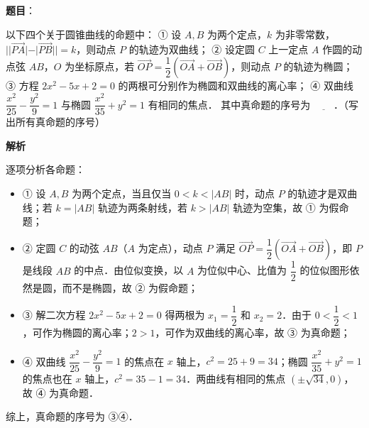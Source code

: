 \begin{answer}

\textbf{题目}：

以下四个关于圆锥曲线的命题中：
① 设 $A, B$ 为两个定点，$k$ 为非零常数，$||\vec{PA}| - |\vec{PB}|| = k$，则动点 $P$ 的轨迹为双曲线；
② 设定圆 $C$ 上一定点 $A$ 作圆的动点弦 $AB$，$O$ 为坐标原点，若 $\vec{OP} = \dfrac{1}{2}(\vec{OA} + \vec{OB})$，则动点 $P$ 的轨迹为椭圆；
③ 方程 $2x^2 - 5x + 2 = 0$ 的两根可分别作为椭圆和双曲线的离心率；
④ 双曲线 $\dfrac{x^2}{25} - \dfrac{y^2}{9} = 1$ 与椭圆 $\dfrac{x^2}{35} + y^2 = 1$ 有相同的焦点．
其中真命题的序号为 $\underline{\hspace{2em}}$．（写出所有真命题的序号）

\textbf{解析}

逐项分析各命题：
\begin{itemize}
\item ① 设 $A, B$ 为两个定点，当且仅当 $0 < k < |AB|$ 时，动点 $P$ 的轨迹才是双曲线；若 $k = |AB|$ 轨迹为两条射线，若 $k > |AB|$ 轨迹为空集，故 ① 为假命题；
\item ② 定圆 $C$ 的动弦 $AB$（$A$ 为定点），动点 $P$ 满足 $\vec{OP} = \dfrac{1}{2}(\vec{OA} + \vec{OB})$，即 $P$ 是线段 $AB$ 的中点．由位似变换，以 $A$ 为位似中心、比值为 $\dfrac{1}{2}$ 的位似图形依然是圆，而不是椭圆，故 ② 为假命题；
\item ③ 解二次方程 $2x^2 - 5x + 2 = 0$ 得两根为 $x_1 = \dfrac{1}{2}$ 和 $x_2 = 2$．由于 $0 < \dfrac{1}{2} < 1$，可作为椭圆的离心率；$2 > 1$，可作为双曲线的离心率，故 ③ 为真命题；
\item ④ 双曲线 $\dfrac{x^2}{25} - \dfrac{y^2}{9} = 1$ 的焦点在 $x$ 轴上，$c^2 = 25 + 9 = 34$；椭圆 $\dfrac{x^2}{35} + y^2 = 1$ 的焦点也在 $x$ 轴上，$c^2 = 35 - 1 = 34$．两曲线有相同的焦点 $(\pm\sqrt{34}, 0)$，故 ④ 为真命题．
\end{itemize}
综上，真命题的序号为 ③④．


\end{answer}
